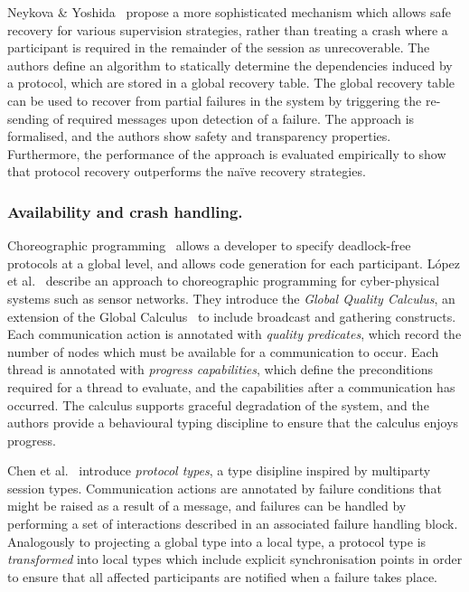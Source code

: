 \documentclass[
graybox,
envcountchap
]{svmult}
\begin{document}
\begin{bibunit}
  Neykova \& Yoshida~\cite{NeykovaY17:let-it-recover} propose a more
  sophisticated mechanism which allows safe recovery for various supervision
  strategies, rather than treating a crash where a participant is required in
  the remainder of the session as unrecoverable. The authors define an algorithm
  to statically determine the dependencies induced by a protocol, which are
  stored in a global recovery table. The global recovery table can be used to
  recover from partial failures in the system by triggering the re-sending of
  required messages upon detection of a failure. The approach is formalised, and
  the authors show safety and transparency properties. Furthermore, the
  performance of the approach is evaluated empirically to show that protocol
  recovery outperforms the na\"ive recovery strategies.

  \subsubsection{Availability and crash handling.}

  Choreographic programming~\cite{CarboneM13:df-design} allows a developer to
  specify deadlock-free protocols at a global level, and allows code generation
  for each participant. L\'opez et al.~\cite{LopezNN16:availability} describe an
  approach to choreographic programming for cyber-physical systems such as
  sensor networks. They introduce the \emph{Global Quality Calculus}, an
  extension of the Global Calculus~\cite{CarboneM13:df-design} to include
  broadcast and gathering constructs. Each communication action is annotated
  with \emph{quality predicates}, which record the number of nodes which must be
  available for a communication to occur. Each thread is annotated with
  \emph{progress capabilities}, which define the preconditions required for a
  thread to evaluate, and the capabilities after a communication has occurred.
  The calculus supports graceful degradation of the system, and the authors
  provide a behavioural typing discipline to ensure that the calculus enjoys
  progress.

  Chen et al.~\cite{ChenVBZE16:failure-handling} introduce \emph{protocol
  types}, a type disipline inspired by multiparty session types. Communication
  actions are annotated by failure conditions that might be raised as a result
  of a message, and failures can be handled by performing a set of interactions
  described in an associated failure handling block. Analogously to projecting a
  global type into a local type, a protocol type is \emph{transformed} into
  local types which include explicit synchronisation points in order to ensure
  that all affected participants are notified when a failure takes place.


\end{bibunit}
\end{document}
